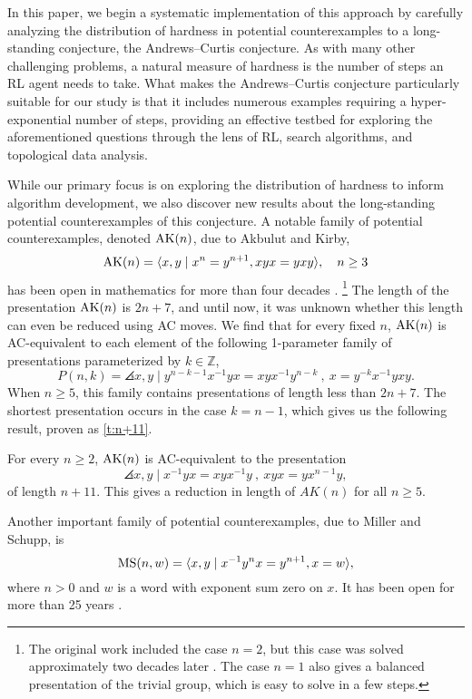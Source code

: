 In this paper, we begin a systematic implementation of this approach by carefully analyzing the distribution of hardness in potential counterexamples to a long-standing conjecture, the Andrews--Curtis conjecture. As with many other challenging problems, a natural measure of hardness is the number of steps an RL agent needs to take. What makes the Andrews--Curtis conjecture particularly suitable for our study is that it includes numerous examples requiring a hyper-exponential number of steps, providing an effective testbed for exploring the aforementioned questions through the lens of RL, search algorithms, and topological data analysis.

While our primary focus is on exploring the distribution of hardness to inform algorithm development, we also discover new results about the long-standing potential counterexamples of this conjecture. A notable family of potential counterexamples, denoted $\text{AK}(n)$, due to Akbulut and Kirby, 
\[
\text{AK}(n) = \langle x, y \mid x^n = y^{n+1}, xyx = yxy\rangle, \quad n \geq 3
\]
has been open in mathematics for more than four decades \cite{Akbulut--Kirby}.
\footnote{The original work included the case $n=2$, but this case was solved approximately two decades later \cite{genetic}. The case $n=1$ also gives a balanced presentation of the trivial group, which is easy to solve in a few steps.}
The length of the presentation $\text{AK}(n)$ is $2n + 7$, and 
until now, it was unknown whether this length can even be reduced using AC moves. We find that for every fixed $n$, $\text{AK}(n)$ is AC-equivalent to each element of the following 1-parameter family of presentations parameterized by $k \in \mathbb{Z}$,
\[
P(n, k) = \angles{x, y \mid  y^{n-k-1}  x^{-1} y x = x y x^{-1} y^{n-k} \ , \ x = y^{-k} x^{-1} y x y }.
\]
When $n \geq 5$, this family contains presentations of length less than $2n + 7$. The shortest presentation occurs in the case $k=n-1$, which gives us the following result, proven as \cref{t:n+11}.

\begin{introtheorem}
	For every $n\geq 2$, $\text{AK}(n)$ is AC-equivalent to the presentation
	\[
	\angles{ x,y \mid x^{-1} y x = x y x^{-1} y \ ,\  xyx=yx^{n-1}y },
	\]
	of length $n+11$. This gives a reduction in length of $AK(n)$ for all $n \geq 5$.
\end{introtheorem}

Another important family of potential counterexamples, due to Miller and Schupp, is
\[
\text{MS}(n, w) = \langle x, y \mid x^{-1} y^n x = y^{n+1}, x = w\rangle,
\]
where $n > 0$ and $w$ is a word with exponent sum zero on $x$. 
It has been open for more than 25 years \cite{Miller--Schupp}.

